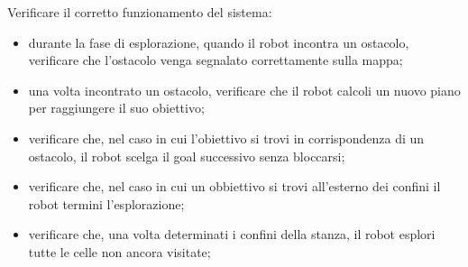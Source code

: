 Verificare il corretto funzionamento del sistema:

\begin{itemize}
\item durante la fase di esplorazione, quando il robot incontra un ostacolo, verificare che l'ostacolo venga segnalato correttamente sulla mappa;
\item una volta incontrato un ostacolo, verificare che il robot calcoli un nuovo piano per raggiungere il suo obiettivo;
\item verificare che, nel caso in cui l'obiettivo si trovi in corrispondenza di un ostacolo, il robot scelga il goal successivo senza bloccarsi;
\item verificare che, nel caso in cui un obbiettivo si trovi all'esterno dei confini il robot termini l'esplorazione;
\item verificare che, una volta determinati i confini della stanza, il robot esplori tutte le celle non ancora visitate;
\end{itemize}{}